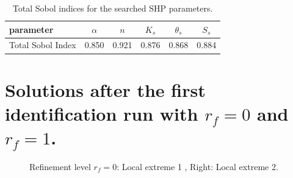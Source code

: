 \documentclass[review,times,3p,twocolumn,10pt]{elsarticle}
\begin{document}
\begin{table}[ht]
\begin{center}
\caption{Total Sobol indices for the searched SHP parameters.}
\begin{small}
\doublespacing
\begin{tabular}{l||c c c c c}
\toprule
parameter & $\alpha$ & $n$ & $K_s$ & $\theta_s$ & $S_s$ \\ \hline
\toprule
Total Sobol Index & 0.850 & 0.921 & 0.876 & 0.868 & 0.884 \\
\toprule
\end{tabular}
\end{small}
\label{citlivost}
\end{center}
\end{table}

\section{Solutions after the first identification run with $r_f=0$ and $r_f=1$.}

\begin{figure}[htb!]
\label{rf0ex1}
\caption{Refinement level $r_f=0$: Local extreme 1 , Right: Local extreme 2.}
\end{figure}
\end{document}
